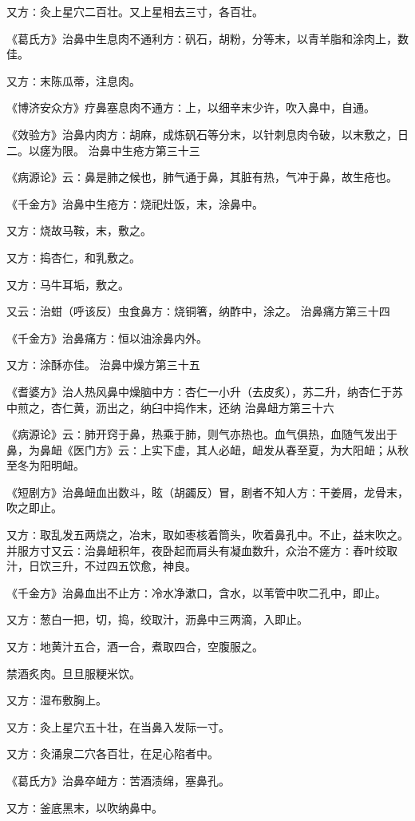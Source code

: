 \documentclass[a4paper,12pt,UTF8,twoside]{ctexbook}
\begin{document}
又方∶灸上星穴二百壮。又上星相去三寸，各百壮。

《葛氏方》治鼻中生息肉不通利方∶矾石，胡粉，分等末，以青羊脂和涂肉上，数佳。

又方∶末陈瓜蒂，注息肉。

《博济安众方》疗鼻塞息肉不通方∶上，以细辛末少许，吹入鼻中，自通。

《效验方》治鼻内肉方∶胡麻，成炼矾石等分末，以针刺息肉令破，以末敷之，日二。以瘥为限。
治鼻中生疮方第三十三

《病源论》云∶鼻是肺之候也，肺气通于鼻，其脏有热，气冲于鼻，故生疮也。

《千金方》治鼻中生疮方∶烧祀灶饭，末，涂鼻中。

又方∶烧故马鞍，末，敷之。

又方∶捣杏仁，和乳敷之。

又方∶马牛耳垢，敷之。

又云∶治蚶（呼该反）虫食鼻方∶烧铜箸，纳酢中，涂之。
治鼻痛方第三十四

《千金方》治鼻痛方∶恒以油涂鼻内外。

又方∶涂酥亦佳。
治鼻中燥方第三十五

《耆婆方》治人热风鼻中燥脑中方∶杏仁一小升（去皮炙），苏二升，纳杏仁于苏中煎之，杏仁黄，沥出之，纳臼中捣作末，还纳
治鼻衄方第三十六

《病源论》云∶肺开窍于鼻，热乘于肺，则气亦热也。血气俱热，血随气发出于鼻，为鼻衄《医门方》云∶上实下虚，其人必衄，衄发从春至夏，为大阳衄；从秋至冬为阳明衄。

《短剧方》治鼻衄血出数斗，眩（胡蠲反）冒，剧者不知人方∶干姜屑，龙骨末，吹之即止。

又方∶取乱发五两烧之，冶末，取如枣核着筒头，吹着鼻孔中。不止，益末吹之。并服方寸又云∶治鼻衄积年，夜卧起而肩头有凝血数升，众治不瘥方∶舂叶绞取汁，日饮三升，不过四五饮愈，神良。

《千金方》治鼻血出不止方∶冷水净漱口，含水，以苇管中吹二孔中，即止。

又方∶葱白一把，切，捣，绞取汁，沥鼻中三两滴，入即止。

又方∶地黄汁五合，酒一合，煮取四合，空腹服之。

禁酒炙肉。旦旦服粳米饮。

又方∶湿布敷胸上。

又方∶灸上星穴五十壮，在当鼻入发际一寸。

又方∶灸涌泉二穴各百壮，在足心陷者中。

《葛氏方》治鼻卒衄方∶苦酒渍绵，塞鼻孔。

又方∶釜底黑末，以吹纳鼻中。
\end{document}
